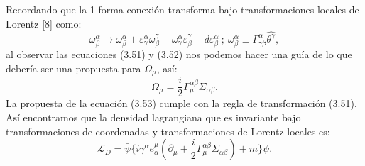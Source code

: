 Recordando que la 1-forma conexión transforma bajo transformaciones locales de Lorentz [8] como:
\begin{equation}
\omega_{\beta}^{\alpha}\to\omega_{\beta}^{\alpha}+\varepsilon_{\gamma}^{\alpha}\omega_{\beta}^{\gamma}-\omega_{\gamma}^{\alpha}\varepsilon_{\beta}^{\gamma}-d\varepsilon_{\beta}^{\alpha} \ ; \ \omega_{\beta}^{\alpha}\equiv\Gamma_{\gamma\beta}^{\alpha}\hat{\theta^{\gamma}} ,
\end{equation}
al observar las ecuaciones (3.51) y (3.52) nos podemos hacer una guía de lo que debería ser una propuesta para $\Omega_\mu$, así:
\begin{equation}
\Omega_{\mu}=\frac{i}{2}\Gamma_{\mu}^{\alpha\beta}\Sigma_{\alpha\beta} .
\end{equation} 
La propuesta de la ecuación (3.53) cumple con la regla de transformación (3.51). Así encontramos que la densidad lagrangiana que es invariante bajo transformaciones de coordenadas y transformaciones de Lorentz locales es:
\begin{equation}
\mathcal{L}_{D}=\bar{\psi}\{i\gamma^{\alpha}e_{\alpha}^{\mu}(\partial_{\mu}+\frac{i}{2}\Gamma_{\mu}^{\alpha\beta}\Sigma_{\alpha\beta})+m\}\psi .
\end{equation}


